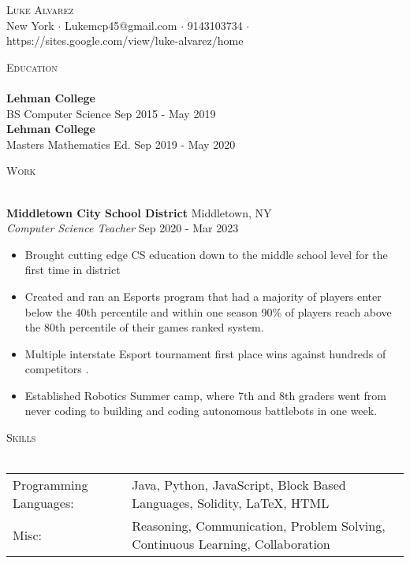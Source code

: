 \documentclass[a4paper]{article}
\newcommand{\lineunder} {
    \vspace*{-8pt} \\
    \hspace*{-18pt} \hrulefill \\
}
\newcommand{\header} [1] {
    {\hspace*{-18pt}\vspace*{6pt} \textsc{#1}}
    \vspace*{-6pt} \lineunder
}
\begin{document}
\vspace*{-40pt}

    

\vspace*{-10pt}
\begin{center}
	{\Huge \scshape {Luke Alvarez}}\\
	New York $\cdot$ Lukemcp45@gmail.com $\cdot$ 9143103734 $\cdot$ https://sites.google.com/view/luke-alvarez/home\\
\end{center}

\header{Education}
\textbf{Lehman College}\\
BS Computer Science \hfill Sep 2015 - May 2019\\
\vspace{2mm}
\textbf{Lehman College}\\
Masters Mathematics Ed. \hfill Sep 2019 - May 2020\\
\vspace{2mm}

\header{Work}
\vspace{1mm}

\textbf{Middletown City School District} \hfill Middletown, NY\\
\textit{Computer Science Teacher} \hfill Sep 2020 - Mar 2023\\
\vspace{-1mm}
\begin{itemize} \itemsep 1pt
	\item Brought cutting edge CS education down to the middle school level for the first time in district
	\item Created and ran an Esports program that had a majority of players enter below the 40th percentile and within one season 90\% of players reach above the 80th percentile of their games ranked system.
	\item Multiple interstate Esport tournament first place wins against hundreds of competitors .
	\item Established Robotics Summer camp, where 7th and 8th graders went from never coding to building and coding autonomous battlebots in one week.
\end{itemize}

\header{Skills}
\begin{tabular}{ l l }
	Programming Languages: & Java, Python, JavaScript, Block Based Languages, Solidity, LaTeX, HTML        \\
	Misc:                  & Reasoning, Communication, Problem Solving, Continuous Learning, Collaboration \\
\end{tabular}
\vspace{2mm}
\end{document}
